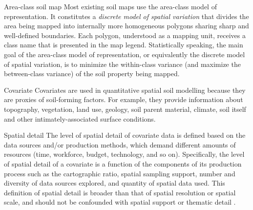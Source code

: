 Area-class soil map
Most existing soil maps use the area-class model of representation. It 
constitutes a \emph{discrete model of spatial variation} that divides the area being mapped into 
internally more homogeneous polygons sharing sharp and well-defined boundaries. Each polygon, 
understood as a mapping unit, receives a class name that is presented in the map legend. 
Statistically speaking, the main goal of the area-class model of representation, or equivalently 
the discrete model of spatial variation, is to minimize the within-class variance (and maximize 
the between-class variance) of the soil property being mapped.
 
Covariate
Covariates are used in quantitative spatial soil modelling because they are 
proxies of soil-forming factors. For example, they provide information about topography, 
vegetation, land use, geology, soil parent material, climate, soil itself and other 
intimately-associated surface conditions.
 
Spatial detail
The level of spatial detail of covariate data is defined based on the data 
sources and/or production methods, which demand different amounts of resources (time, workforce, 
budget, technology, and so on). Specifically, the level of spatial detail of a covariate is a 
function of the components of its production process such as the cartographic ratio, spatial 
sampling support, number and diversity of data sources explored, and quantity of spatial data used. 
This definition of spatial detail is broader than that of spatial resolution or spatial scale, and 
should not be confounded with spatial support \cite{WebsterEtAl2007} or thematic detail 
\cite{Rossiter2000}.
